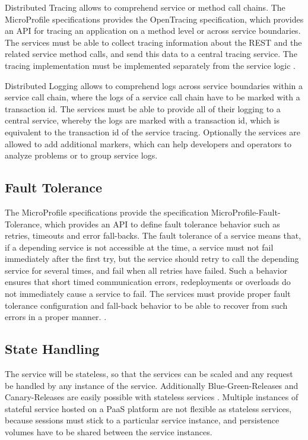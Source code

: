 Distributed Tracing allows to comprehend service or method call chains. The MicroProfile specifications provides the OpenTracing specification, which provides an API for tracing an application on a method level or across service boundaries. The services must be able to collect tracing information about the REST and the related service method calls, and send this data to a central tracing service. The tracing implementation must be implemented separately from the service logic \cite{CNCFOpentracing2018}.

Distributed Logging allows to comprehend logs across service boundaries within a service call chain, where the logs of a service call chain have to be marked with a transaction id. The services must be able to provide all of their logging to a central service, whereby the logs are marked with a transaction id, which is equivalent to the transaction id of the service tracing. Optionally the services are allowed to add additional markers, which can help developers and operators to analyze problems or to group service logs.

\subsection{Fault Tolerance}
\label{sec:esboc-requirements-service-fault}
The MicroProfile specifications provide the specification MicroProfile-Fault-Tolerance, which provides an API to define fault tolerance behavior such as retries, timeouts and error fall-backs. The fault tolerance of a service means that, if a depending service is not accessible at the time, a service must not fail immediately after the first try, but the service should retry to call the depending service for several times, and fail when all retries have failed. Such a behavior ensures that short timed communication errors, redeployments or overloads do not immediately cause a service to fail. The services must provide proper fault tolerance configuration and fall-back behavior to be able to recover from such errors in a proper manner. \cite{EclipseMicroprofileFault2018}.   

\subsection{State Handling}
\label{sec:esboc-requirements-service-state}
The service will be stateless, so that the services can be scaled and any request be handled by any instance of the service. Additionally Blue-Green-Releases and Canary-Releases are easily possible with stateless services \cite{FowlerBlueGreenRelease2010, FowlerCanaryRelease2010}. Multiple instances of stateful service hosted on a PaaS platform are not flexible as stateless services, because sessions must stick to a particular service instance, and persistence volumes have to be shared between the service instances.  

